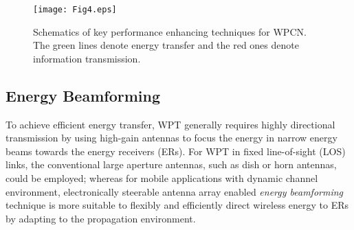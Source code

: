\documentclass[journal, draftcls, one column, 12pt]{IEEEtran}
\begin{document}
\begin{figure}
\centering
  \begin{center}
    \texttt{[image: Fig4.eps]}
  \end{center}
  \caption{Schematics of key performance enhancing techniques for WPCN. The green lines denote energy transfer and the red ones denote information transmission.}
  \label{74}
\end{figure}


\subsection{Energy Beamforming}
To achieve efficient energy transfer, WPT generally requires highly directional transmission by using high-gain antennas to focus the energy in narrow energy beams towards the energy receivers (ERs). For WPT in fixed line-of-sight (LOS) links, the conventional large aperture antennas, such as dish or horn antennas, could be employed; whereas for mobile applications with dynamic channel environment, electronically steerable antenna array enabled \emph{energy beamforming} technique \cite{2015:Bi} is more suitable to flexibly and efficiently direct wireless energy to ERs by adapting to the propagation environment.
\end{document}
